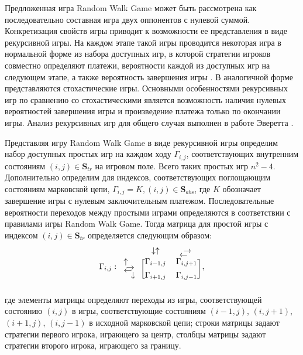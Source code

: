 Предложенная игра Random Walk Game может быть рассмотрена как последовательно составная игра двух оппонентов с нулевой суммой. Конкретизация свойств игры приводит к возможности ее представления в виде рекурсивной игры. На каждом этапе такой игры проводится некоторая игра в нормальной форме из набора доступных игр, в которой стратегии игроков совместно определяют платежи, вероятности каждой из доступных игр на следующем этапе, а также вероятность завершения игры \cite{luce_games_1957a}. В аналогичной форме представляются стохастические игры. Основными особенностями рекурсивных игр по сравнению со стохастическими является возможность наличия нулевых вероятностей завершения игры и произведение платежа только по окончании игры. Анализ рекурсивных игр для общего случая выполнен в работе Эверетта \cite{everett_recursive_1958}.

Представляя игру Random Walk Game в виде рекурсивной игры определим набор доступных простых игр на каждом ходу $\Gamma_{i,j}$, соответствующих внутренним состояниям $(i, j) \in \textbf{S}_{tr}$ на игровом поле. Всего таких простых игр $n^2-4$. Дополнительно определим для индексов, соответствующих поглощающим состояниям марковской цепи, $\Gamma_{i,j}=K, (i,j) \in \textbf{S}_{abs}$, где $K$ обозначает завершение игры с нулевым заключительным платежом. Последовательные вероятности переходов между простыми играми определяются в соответствии с правилами игры Random Walk Game. Тогда матрица для простой игры с индексом $(i, j) \in \textbf{S}_{tr}$ определяется следующим образом:
\begin{equation}
    \begin{aligned}
        \Gamma_{i,j}: \begin{blockarray}{ccc}
     & \mathbin\downarrow\hspace{-0.3em}\uparrow & \text{\makebox[2pt][l]{\raisebox{-5pt}{$\leftarrow$}}}\rightarrow \\
    \begin{block}{l[cc]}
        \text{\makebox[3pt][l]{\raisebox{0pt}{$\uparrow$}}}\text{\makebox[0pt][l]{\raisebox{-7pt}{$\rightarrow$}}} & \Gamma_{i-1,j} & \Gamma_{i,j+1} \\
        \text{\makebox[6pt][l]{\raisebox{6pt}{$\leftarrow$}}}\downarrow & \Gamma_{i+1,j} & \Gamma_{i,j-1} \\
    \end{block}
    \end{blockarray},
    \label{eq:recursive-game-transitions}
    \end{aligned}
\end{equation}
где элементы матрицы определяют переходы из игры, соответствующей состоянию $(i, j)$ в игры, соответствующие состояниям $(i-1, j)$, $(i, j+1)$, $(i+1, j)$, $(i, j-1)$ в исходной марковской цепи; строки матрицы задают стратегии первого игрока, играющего за центр, столбцы матрицы задают стратегии второго игрока, играющего за границу. 

